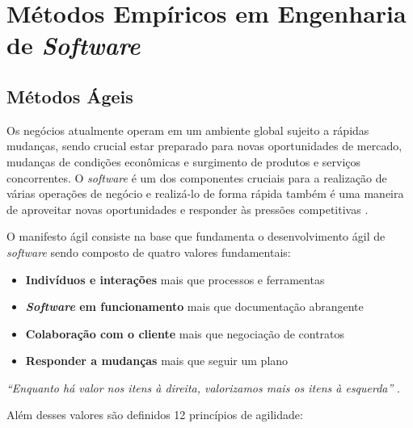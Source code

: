 \chapter{Métodos Empíricos em Engenharia de \textit{Software}}

\section{Métodos Ágeis}
Os negócios atualmente operam em um ambiente global sujeito a rápidas mudanças, sendo crucial estar preparado para novas oportunidades de mercado, mudanças de condições econômicas e surgimento de produtos e serviços concorrentes. O \textit{software} é um dos componentes cruciais para a realização de várias operações de negócio e realizá-lo de forma rápida também é uma maneira de aproveitar novas oportunidades e responder às pressões competitivas \cite{sommerville_2006}.

O manifesto ágil \cite{beck2001agile} consiste na base que fundamenta o desenvolvimento ágil de
\textit{software} sendo composto de quatro valores fundamentais:

\begin{itemize}
    \item \textbf{Indivíduos e interações} mais que processos e ferramentas
    \item \textbf{\textit{Software} em funcionamento} mais que documentação abrangente
    \item \textbf{Colaboração com o cliente} mais que negociação de contratos
    \item \textbf{Responder a mudanças} mais que seguir um plano
\end{itemize}

\textit{``Enquanto há valor nos itens à direita, valorizamos mais os itens à esquerda''} \cite{beck2001agile}.

Além desses valores são definidos 12 princípios de agilidade:


